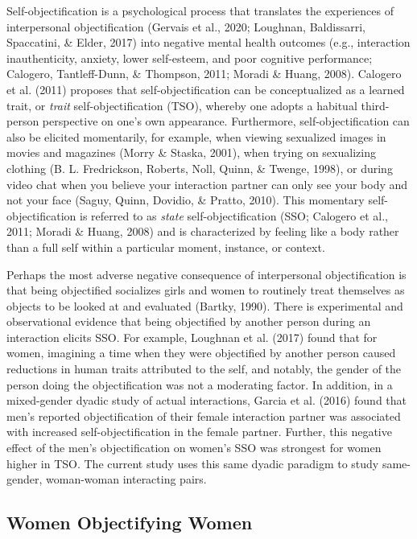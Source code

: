 \documentclass[man]{apa6}
\begin{document}
Self-objectification is a psychological process that translates the
experiences of interpersonal objectification (Gervais et al., 2020;
Loughnan, Baldissarri, Spaccatini, \& Elder, 2017) into negative mental
health outcomes (e.g., interaction inauthenticity, anxiety, lower
self-esteem, and poor cognitive performance; Calogero, Tantleff-Dunn, \&
Thompson, 2011; Moradi \& Huang, 2008). Calogero et al. (2011) proposes
that self-objectification can be conceptualized as a learned trait, or
\emph{trait} self-objectification (TSO), whereby one adopts a habitual
third-person perspective on one's own appearance. Furthermore,
self-objectification can also be elicited momentarily, for example, when
viewing sexualized images in movies and magazines (Morry \& Staska,
2001), when trying on sexualizing clothing (B. L. Fredrickson, Roberts,
Noll, Quinn, \& Twenge, 1998), or during video chat when you believe
your interaction partner can only see your body and not your face
(Saguy, Quinn, Dovidio, \& Pratto, 2010). This momentary
self-objectification is referred to as \emph{state} self-objectification
(SSO; Calogero et al., 2011; Moradi \& Huang, 2008) and is characterized
by feeling like a body rather than a full self within a particular
moment, instance, or context.

Perhaps the most adverse negative consequence of interpersonal
objectification is that being objectified socializes girls and women to
routinely treat themselves as objects to be looked at and evaluated
(Bartky, 1990). There is experimental and observational evidence that
being objectified by another person during an interaction elicits SSO.
For example, Loughnan et al. (2017) found that for women, imagining a
time when they were objectified by another person caused reductions in
human traits attributed to the self, and notably, the gender of the
person doing the objectification was not a moderating factor. In
addition, in a mixed-gender dyadic study of actual interactions, Garcia
et al. (2016) found that men's reported objectification of their female
interaction partner was associated with increased self-objectification
in the female partner. Further, this negative effect of the men's
objectification on women's SSO was strongest for women higher in TSO.
The current study uses this same dyadic paradigm to study same-gender,
woman-woman interacting pairs.

\subsection{Women Objectifying Women}\label{women-objectifying-women}
\end{document}

